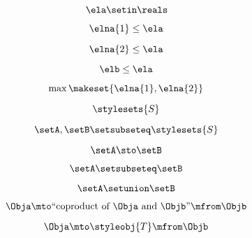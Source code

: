 {\begin{forslides}
    \begin{equation}
        \label{eq:feedback-139}
        \ela\setin \reals
    \end{equation}

    \begin{equation}
        \label{eq:feedback-140}
        \elna{1}\leq \ela
    \end{equation}

    \begin{equation}
        \label{eq:feedback-141}
        \elna{2}\leq \ela
    \end{equation}

    \begin{equation}
        \label{eq:feedback-142}
        \elb\leq \ela
    \end{equation}

    \begin{equation}
        \label{eq:feedback-143}
        \max\makeset{\elna{1},\elna{2}}
    \end{equation}

    \begin{equation}
        \label{eq:feedback-144}
        \stylesets{S}
    \end{equation}

    \begin{equation}
        \label{eq:feedback-145}
        \setA,\setB\setsubseteq \stylesets{S}
    \end{equation}

    \begin{equation}
        \label{eq:feedback-146}
        \setA \sto \setB
    \end{equation}

    \begin{equation}
        \label{eq:feedback-147}
        \setA\setsubseteq \setB
    \end{equation}

    \begin{equation}
        \label{eq:feedback-148}
        \setA\setunion\setB
    \end{equation}

    \begin{equation}
        \label{eq:feedback-149}
        \Obja \mto \text{``coproduct of } \Obja \text{ and } \Objb \text{''}  \mfrom \Objb
    \end{equation}

    \begin{equation}
        \label{eq:feedback-150}
        \Obja \mto \styleobj{T} \mfrom \Objb
    \end{equation}


\end{forslides}}
